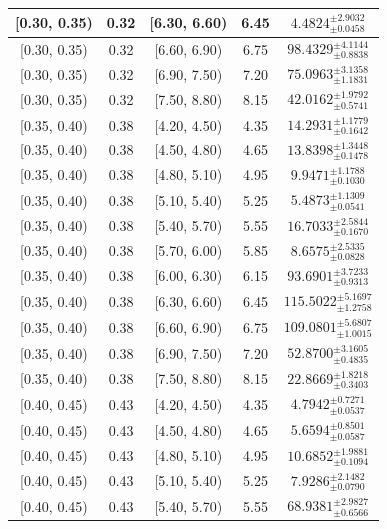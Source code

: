 \begin{longtable}{|c|c|c|c|c|}
\hline
[0.30, 0.35) & 0.32 & [6.30, 6.60) & 6.45 & $4.4824^{ \pm 2.9032 }_{ \pm 0.0458 }$ \\ 
\hline
[0.30, 0.35) & 0.32 & [6.60, 6.90) & 6.75 & $98.4329^{ \pm 4.1144 }_{ \pm 0.8838 }$ \\ 
\hline
[0.30, 0.35) & 0.32 & [6.90, 7.50) & 7.20 & $75.0963^{ \pm 3.1358 }_{ \pm 1.1831 }$ \\ 
\hline
[0.30, 0.35) & 0.32 & [7.50, 8.80) & 8.15 & $42.0162^{ \pm 1.9792 }_{ \pm 0.5741 }$ \\ 
\hline
[0.35, 0.40) & 0.38 & [4.20, 4.50) & 4.35 & $14.2931^{ \pm 1.1779 }_{ \pm 0.1642 }$ \\ 
\hline
[0.35, 0.40) & 0.38 & [4.50, 4.80) & 4.65 & $13.8398^{ \pm 1.3448 }_{ \pm 0.1478 }$ \\ 
\hline
[0.35, 0.40) & 0.38 & [4.80, 5.10) & 4.95 & $9.9471^{ \pm 1.1788 }_{ \pm 0.1030 }$ \\ 
\hline
[0.35, 0.40) & 0.38 & [5.10, 5.40) & 5.25 & $5.4873^{ \pm 1.1309 }_{ \pm 0.0541 }$ \\ 
\hline
[0.35, 0.40) & 0.38 & [5.40, 5.70) & 5.55 & $16.7033^{ \pm 2.5844 }_{ \pm 0.1670 }$ \\ 
\hline
[0.35, 0.40) & 0.38 & [5.70, 6.00) & 5.85 & $8.6575^{ \pm 2.5335 }_{ \pm 0.0828 }$ \\ 
\hline
[0.35, 0.40) & 0.38 & [6.00, 6.30) & 6.15 & $93.6901^{ \pm 3.7233 }_{ \pm 0.9313 }$ \\ 
\hline
[0.35, 0.40) & 0.38 & [6.30, 6.60) & 6.45 & $115.5022^{ \pm 5.1697 }_{ \pm 1.2758 }$ \\ 
\hline
[0.35, 0.40) & 0.38 & [6.60, 6.90) & 6.75 & $109.0801^{ \pm 5.6807 }_{ \pm 1.0015 }$ \\ 
\hline
[0.35, 0.40) & 0.38 & [6.90, 7.50) & 7.20 & $52.8700^{ \pm 3.1605 }_{ \pm 0.4835 }$ \\ 
\hline
[0.35, 0.40) & 0.38 & [7.50, 8.80) & 8.15 & $22.8669^{ \pm 1.8218 }_{ \pm 0.3403 }$ \\ 
\hline
[0.40, 0.45) & 0.43 & [4.20, 4.50) & 4.35 & $4.7942^{ \pm 0.7271 }_{ \pm 0.0537 }$ \\ 
\hline
[0.40, 0.45) & 0.43 & [4.50, 4.80) & 4.65 & $5.6594^{ \pm 0.8501 }_{ \pm 0.0587 }$ \\ 
\hline
[0.40, 0.45) & 0.43 & [4.80, 5.10) & 4.95 & $10.6852^{ \pm 1.9881 }_{ \pm 0.1094 }$ \\ 
\hline
[0.40, 0.45) & 0.43 & [5.10, 5.40) & 5.25 & $7.9286^{ \pm 2.1482 }_{ \pm 0.0790 }$ \\ 
\hline
[0.40, 0.45) & 0.43 & [5.40, 5.70) & 5.55 & $68.9381^{ \pm 2.9827 }_{ \pm 0.6566 }$ \\ 

\end{longtable}
